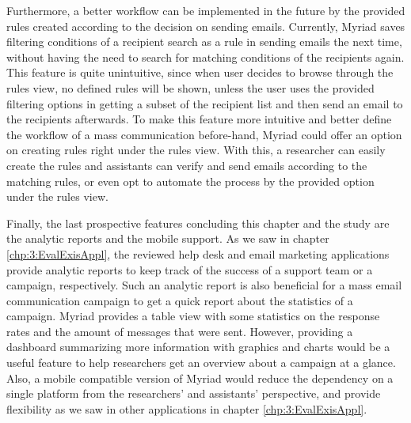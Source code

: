 Furthermore, a better workflow can be implemented in the future by the provided rules created according to the decision on sending emails. Currently, Myriad saves filtering conditions of a recipient search as a rule in sending emails the next time, without having the need to search for matching conditions of the recipients again. This feature is quite unintuitive, since when user decides to browse through the rules view, no defined rules will be shown, unless the user uses the provided filtering options in getting a subset of the recipient list and then send an email to the recipients afterwards. To make this feature more intuitive and better define the workflow of a mass communication before-hand, Myriad could offer an option on creating rules right under the rules view. With this, a researcher can easily create the rules and assistants can verify and send emails according to the matching rules, or even opt to automate the process by the provided option under the rules view.
\vspace{1cm}

Finally, the last prospective features concluding this chapter and the study are the analytic reports and the mobile support. As we saw in chapter \ref{chp:3:EvalExisAppl}, the reviewed help desk and email marketing applications provide analytic reports to keep track of the success of a support team or a campaign, respectively. Such an analytic report is also beneficial for a mass email communication campaign to get a quick report about the statistics of a campaign. Myriad provides a table view with some statistics on the response rates and the amount of messages that were sent. However, providing a dashboard summarizing more information with graphics and charts would be a useful feature to help researchers get an overview about a campaign at a glance. Also, a mobile compatible version of Myriad would reduce the dependency on a single platform from the researchers' and assistants' perspective, and provide flexibility as we saw in other applications in chapter \ref{chp:3:EvalExisAppl}.

\clearemptydoublepage 